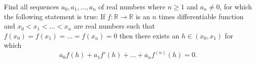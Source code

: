 \documentclass{article}
\begin{document}
\setlength{\parindent}{0pt}
Find all sequences $a_{0},a_{1},\dots,a_{n}$ of real numbers where $n\ge1$ and $a_{n}\ne0$, for which the following statement is true:\newline
If $f:\mathbb{R}\to\mathbb{R}$ is an $n$ times differentiable function and $x_{0}<x_{1}<\dots<x_{n}$ are real numbers such that $f(x_{0})=f(x_{1})=\dots=f(x_{n})=0$ then there exists an $h\in(x_{0},x_{1})$ for which$$a_{0}f(h)+a_{1}f'(h)+\dots+a_{n}f^{(n)}(h)=0.$$
\end{document}
